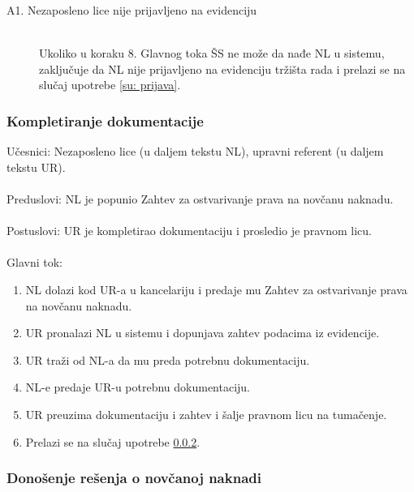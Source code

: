 \begin{description}
	\item[A1. Nezaposleno lice nije prijavljeno na evidenciju] ~\\
	Ukoliko u koraku 8. Glavnog toka ŠS ne može da nađe NL u sistemu, zaključuje da NL nije prijavljeno na evidenciju tržišta rada i prelazi se na slučaj upotrebe \ref{su: prijava}.
\end{description}

\subsubsection{Kompletiranje dokumentacije}
\label{su: kompletiranje dokumentacije}

\noindent Učesnici: Nezaposleno lice (u daljem tekstu NL), upravni referent (u daljem tekstu UR).
\\
\\ Preduslovi: NL je popunio Zahtev za ostvarivanje prava na novčanu naknadu.
\\
\\ Postuslovi: UR je kompletirao dokumentaciju i prosledio je pravnom licu.
\\
\\ Glavni tok:
\begin{enumerate}
\item NL dolazi kod UR-a u kancelariju i predaje mu Zahtev za ostvarivanje prava na novčanu naknadu.
\item UR pronalazi NL u sistemu i dopunjava zahtev podacima iz evidencije.
\item UR traži od NL-a da mu preda potrebnu dokumentaciju.
\item NL-e predaje UR-u potrebnu dokumentaciju.
\item UR preuzima dokumentaciju i zahtev i šalje pravnom licu na tumačenje.
\item Prelazi se na slu\v caj upotrebe \ref{su: resenje}.
\end{enumerate}

\subsubsection{Donošenje rešenja o novčanoj naknadi}
\label{su: resenje}

